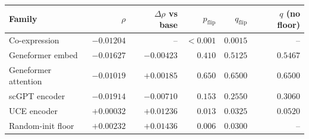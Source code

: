 \begin{tabular}{lrrrrr}
\toprule
Family & $\rho$ & $\Delta\rho$ vs base & $p_{\mathrm{flip}}$ & $q_{\mathrm{flip}}$ & $q$ (no floor) \\
\midrule
Co-expression & $-0.01204$ & -- & $<0.001$ & $0.0015$ & -- \\
Geneformer embed & $-0.01627$ & $-0.00423$ & $0.410$ & $0.5125$ & $0.5467$ \\
Geneformer attention & $-0.01019$ & $+0.00185$ & $0.650$ & $0.6500$ & $0.6500$ \\
scGPT encoder & $-0.01914$ & $-0.00710$ & $0.153$ & $0.2550$ & $0.3060$ \\
UCE encoder & $+0.00032$ & $+0.01236$ & $0.013$ & $0.0325$ & $0.0520$ \\
Random-init floor & $+0.00232$ & $+0.01436$ & $0.006$ & $0.0300$ & -- \\
\bottomrule
\end{tabular}
